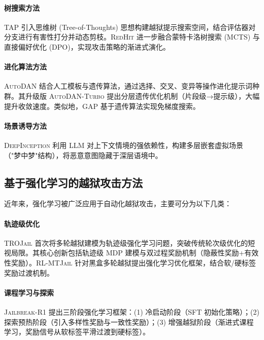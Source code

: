 \documentclass[12pt,a4paper]{article}
\begin{document}
\paragraph{树搜索方法}
\textsc{TAP}\cite{mehrotri2023tree} 引入思维树 (Tree-of-Thoughts) 思想构建越狱提示搜索空间，结合评估器对分支进行有害性打分并动态剪枝。\textsc{RedHit}\cite{sorkhpour2025redhit} 进一步融合蒙特卡洛树搜索 (MCTS) 与直接偏好优化 (DPO)，实现攻击策略的渐进式演化。

\paragraph{进化算法方法}
\textsc{AutoDAN}\cite{liu2023autodan} 结合人工模板与遗传算法，通过选择、交叉、变异等操作进化提示词种群。其升级版 \textsc{AutoDAN-Turbo}\cite{liu2024autodanturbo} 提出分层遗传优化机制（片段级→提示级），大幅提升收敛速度。类似地，\textsc{GAP}\cite{guo2024gap} 基于遗传算法实现免梯度搜索。

\paragraph{场景诱导方法}
\textsc{DeepInception}\cite{li2023deepinception} 利用 LLM 对上下文情境的强依赖性，构建多层嵌套虚拟场景（"梦中梦"结构），将恶意意图隐藏于深层语境中。

\subsection{基于强化学习的越狱攻击方法}

近年来，强化学习被广泛应用于自动化越狱攻击，主要可分为以下几类：

\paragraph{轨迹级优化}
\textsc{TROJail}\cite{xiong2026trojail} 首次将多轮越狱建模为轨迹级强化学习问题，突破传统轮次级优化的短视局限。其核心创新包括轨迹级 MDP 建模与双过程奖励机制（隐蔽性奖励+有效性奖励）。\textsc{RL-MTJail}\cite{chen2025rlmtjail} 针对黑盒多轮越狱提出强化学习优化框架，结合软/硬标签奖励过渡机制。

\paragraph{课程学习与探索}
\textsc{Jailbreak-R1}\cite{guo2025jailbreakr1} 提出三阶段强化学习框架：(1) 冷启动阶段（SFT 初始化策略）；(2) 探索预热阶段（引入多样性奖励与一致性奖励）；(3) 增强越狱阶段（渐进式课程学习，奖励信号从软标签平滑过渡到硬标签）。
\end{document}
